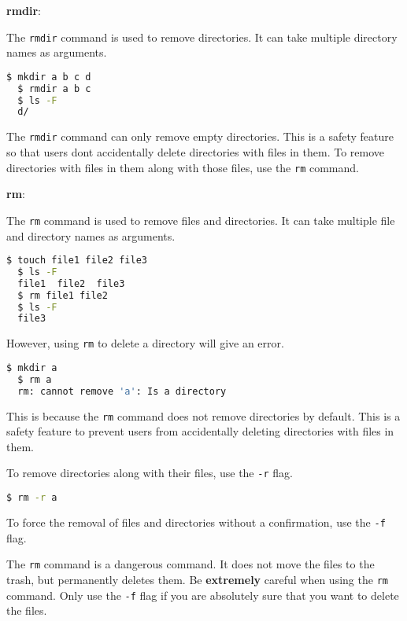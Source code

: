 \textbf{rmdir}:

The \lstinline|rmdir| command is used to remove directories.
It can take multiple directory names as arguments.

\begin{lstlisting}[language=bash]
  $ mkdir a b c d
  $ rmdir a b c
  $ ls -F
  d/
\end{lstlisting}

\begin{remark}
  The \lstinline|rmdir| command can only remove empty directories.
  This is a safety feature so that users dont accidentally delete directories with files in them.
  To remove directories with files in them along with those files, use the \lstinline|rm| command.
\end{remark}

\textbf{rm}:

The \lstinline|rm| command is used to remove files and directories.
It can take multiple file and directory names as arguments.

\begin{lstlisting}[language=bash]
  $ touch file1 file2 file3
  $ ls -F
  file1  file2  file3
  $ rm file1 file2
  $ ls -F
  file3
\end{lstlisting}

However, using \lstinline|rm| to delete a directory will give an error.

\begin{lstlisting}[language=bash]
  $ mkdir a
  $ rm a
  rm: cannot remove 'a': Is a directory
\end{lstlisting}

This is because the \lstinline|rm| command does not remove directories by default.
This is a safety feature to prevent users from accidentally deleting directories with files in them.

To remove directories along with their files, use the \lstinline|-r| flag.

\begin{lstlisting}[language=bash]
  $ rm -r a
\end{lstlisting}

To force the removal of files and directories without a confirmation, use the \lstinline|-f| flag.

\begin{warn}
  The \lstinline|rm| command is a dangerous command.
  It does not move the files to the trash, but permanently deletes them.
  Be \textbf{extremely} careful when using the \lstinline|rm| command.
  Only use the \lstinline|-f| flag if you are absolutely sure that you want to delete the files.
\end{warn}

